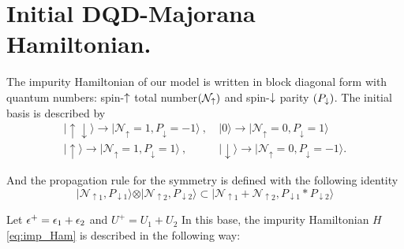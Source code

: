 




\section{Initial DQD-Majorana Hamiltonian.\label{sec:Double-Dot-Majorana-Hamiltonian.}}

The impurity Hamiltonian of our model is written in block diagonal form with quantum numbers: spin-$\uparrow$ total number$(\mathcal{N}_\uparrow)$ and spin-$\downarrow$ parity $(P_\downarrow)$. The initial basis is described by 
\begin{align}
\vert \uparrow\downarrow\rangle\longrightarrow\vert \mathcal{N}_\uparrow =1,P_\downarrow=-1\rangle\ ,& \ \vert0\rangle\longrightarrow\vert \mathcal{N}_\uparrow=0,P_\downarrow=1\rangle \\ 
\vert \uparrow\rangle\longrightarrow\vert \mathcal{N}_\uparrow=1,P_\downarrow=1\rangle\ ,& \ \vert \downarrow \rangle\longrightarrow\vert \mathcal{N}_\uparrow=0,P_\downarrow=-1\rangle.
\end{align}

\noindent And the propagation rule for the symmetry is defined with the following identity 
\begin{equation}
  \vert \mathcal{N}_{\uparrow1},P_{\downarrow 1}\rangle\otimes\vert \mathcal{N}_{\uparrow 2},P_{\downarrow 2}\rangle\subset\vert \mathcal{N}_{\uparrow1}+\mathcal{N}_{\uparrow2},P_{\downarrow 1}*P_{\downarrow 2}\rangle \label{eq:PropRuleQD}
\end{equation} 

Let $\epsilon^+ =\epsilon_1 + \epsilon_2$ and $U^+ =U_1 + U_2$ In this base, the impurity Hamiltonian $H$ \eqref{eq:imp_Ham} is described in the following way:


